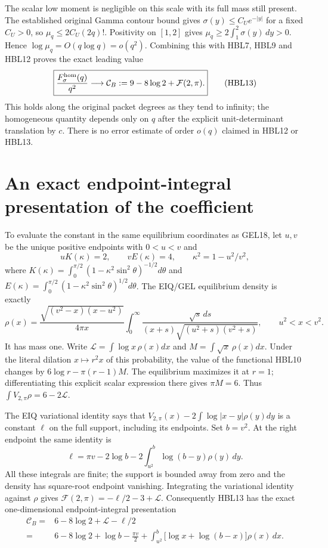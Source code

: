 The scalar low moment is negligible on this scale with its full mass
still present. The established original Gamma contour bound gives
$\sigma(y)\le C_Ue^{-|y|}$ for a fixed $C_U>0$, so
$\mu_q\le2C_U(2q)!$. Positivity on $[1,2]$ gives
$\mu_q\ge2\int_1^2\sigma(y)\,dy>0$. Hence
$\log\mu_q=O(q\log q)=o(q^2)$.
Combining this with HBL7, HBL9 and HBL12 proves the exact leading value
\[
 \boxed{\frac{F_\sigma^{\rm hom}(q)}{q^2}\longrightarrow
   \mathcal C_B:=9-8\log2+\mathcal F(2,\pi).}
 \tag{HBL13}
\]
This holds along the original packet degrees as they tend to infinity;
the homogeneous quantity depends only on $q$ after the explicit
unit-determinant translation by $c$. There is no error estimate of
order $o(q)$ claimed in HBL12 or HBL13.

\section{An exact endpoint-integral presentation of the coefficient}

To evaluate the constant in the same equilibrium coordinates as GEL18,
let $u,v$ be the unique positive endpoints with $0<u<v$ and
\[
 uK(\kappa)=2,\qquad vE(\kappa)=4,\qquad
 \kappa^2=1-u^2/v^2,
\]
where
$K(\kappa)=\int_0^{\pi/2}(1-\kappa^2\sin^2\theta)^{-1/2}d\theta$
and
$E(\kappa)=\int_0^{\pi/2}(1-\kappa^2\sin^2\theta)^{1/2}d\theta$.
The EIQ/GEL equilibrium density is exactly
\[
 \rho(x)=\frac{\sqrt{(v^2-x)(x-u^2)}}{4\pi x}
   \int_0^\infty
    \frac{\sqrt s\,ds}{(x+s)\sqrt{(u^2+s)(v^2+s)}},
 \qquad u^2<x<v^2.
 \tag{HBL14}
\]
It has mass one. Write
$\mathcal L=\int\log x\,\rho(x)dx$ and
$M=\int\sqrt x\,\rho(x)dx$.
Under the literal dilation $x\mapsto r^2x$ of this probability,
the value of the functional HBL10 changes by
$6\log r-\pi(r-1)M$. The equilibrium maximizes it at $r=1$;
differentiating this explicit scalar expression there gives $\pi M=6$.
Thus $\int V_{2,\pi}\rho=6-2\mathcal L$.

The EIQ variational identity says that
$V_{2,\pi}(x)-2\int\log|x-y|\rho(y)dy$ is a constant $\ell$ on
the full support, including its endpoints. Set $b=v^2$. At the right
endpoint the same identity is
\[
 \ell=\pi v-2\log b
            -2\int_{u^2}^{b}\log(b-y)\rho(y)\,dy.
\]
All these integrals are finite; the support is bounded away from zero
and the density has square-root endpoint vanishing. Integrating the
variational identity against $\rho$ gives
$\mathcal F(2,\pi)=-\ell/2-3+\mathcal L$. Consequently HBL13 has
the exact one-dimensional endpoint-integral presentation
\[
 \boxed{\begin{aligned}
 \mathcal C_B={}&6-8\log2+\mathcal L-\ell/2\\
 ={}&6-8\log2+\log b-\frac{\pi v}{2}
       +\int_{u^2}^{b}\big[\log x+\log(b-x)\big]\rho(x)\,dx.
 \end{aligned}}
 \tag{HBL15}
\]

